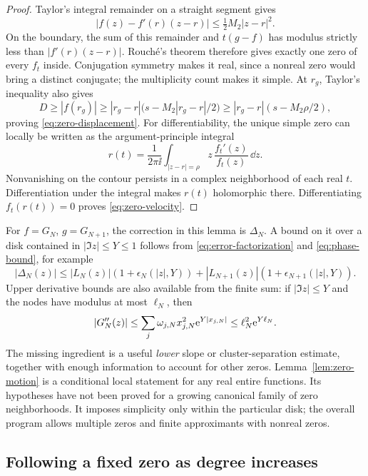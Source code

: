 \begin{proof}
Taylor's integral remainder on a straight segment gives
\[
 |f(z)-f'(r)(z-r)|\le\tfrac12M_2|z-r|^2.
\]
On the boundary, the sum of this remainder and \(t(g-f)\) has
modulus strictly less than \(|f'(r)(z-r)|\). Rouch\'e's theorem
therefore gives exactly one zero of every \(f_t\) inside. Conjugation
symmetry makes it real, since a nonreal zero would bring a distinct
conjugate; the multiplicity count makes it simple.
At \(r_g\), Taylor's inequality also gives
\[
 D\ge|f(r_g)|\ge |r_g-r|\bigl(s-M_2|r_g-r|/2\bigr)
 \ge |r_g-r|(s-M_2\rho/2),
\]
proving \eqref{eq:zero-displacement}. For differentiability, the
unique simple zero can locally be written as the argument-principle
integral
\[
 r(t)=\frac{1}{2\pi\ii}\int_{|z-r|=\rho}
                  z\,\frac{f_t'(z)}{f_t(z)}\,\dd z.
\]
Nonvanishing on the contour persists in a complex neighborhood
of each real \(t\). Differentiation under the integral makes \(r(t)\)
holomorphic there. Differentiating \(f_t(r(t))=0\) proves
\eqref{eq:zero-velocity}.
\end{proof}

For \(f=G_N\), \(g=G_{N+1}\), the correction in this lemma is
\(\Delta_N\). A bound on it over a disk contained in \(|\Im z|\le Y\le1\)
follows from \eqref{eq:error-factorization} and
\eqref{eq:phase-bound}, for example
\[
 |\Delta_N(z)|\le
 |L_N(z)|(1+\epsilon_N(|z|,Y))
 +|L_{N+1}(z)|(1+\epsilon_{N+1}(|z|,Y)).
\]
Upper derivative bounds are also available from the finite sum:
if \(|\Im z|\le Y\) and the nodes have modulus at most \(\ell_N\),
then
\begin{equation}
 |G_N''(z)|\le\sum_j\omega_{j,N}x_{j,N}^2\mathrm e^{Y|x_{j,N}|}
                  \le \ell_N^2\mathrm e^{Y\ell_N}.
 \label{eq:finite-derivative-upper}
\end{equation}
The missing ingredient is a useful \emph{lower} slope or
cluster-separation estimate, together with enough information to
account for other zeros. Lemma~\ref{lem:zero-motion} is a conditional
local statement for any real entire functions. Its hypotheses have
not been proved for a growing canonical family of zero neighborhoods.
It imposes simplicity only within the particular disk; the overall
program allows multiple zeros and finite approximants with nonreal zeros.

\subsection{Following a fixed zero as degree increases}
\label{sec:fixed-zero}

